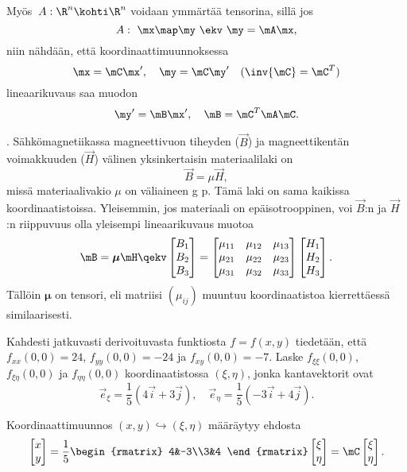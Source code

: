 Myös  $\,A:\R^n\kohti\R^n$ voidaan ymmärtää tensorina, sillä jos
\[
A:\ \mx \map \my \ \ekv \ \my=\mA\mx,
\]
niin nähdään, että koordinaattimuunnoksessa
\[
\mx=\mC\mx',\quad \my=\mC\my'\quad (\inv{\mC}=\mC^T)
\]
lineaarikuvaus saa muodon
\[
\my'=\mB\mx',\quad \mB=\mC^T\mA\mC.
\]
%
\begin{Exa} .
Sähkömagnetiikassa magneettivuon tiheyden ($\vec B$) ja magneettikentän voimakkuuden ($\vec H$)
välinen yksinkertaisin materiaalilaki on
\[
\vec B=\mu\vec H,
\]
missä materiaalivakio $\mu$ on väliaineen g p.
Tämä laki on sama kaikissa koordinaatistoissa. Yleisemmin, jos materiaali on epäisotrooppinen,
voi $\vec B$:n ja $\vec H$:n riippuvuus olla yleisempi lineaarikuvaus muotoa
\[
\mB=\boldsymbol{\mu}\mH \qekv \begin{bmatrix} B_1 \\ B_2 \\ B_3 \end{bmatrix} =
\begin{bmatrix} 
\mu_{11}&\mu_{12}&\mu_{13} \\ \mu_{21}&\mu_{22}&\mu_{23} \\ \mu_{31}&\mu_{32}&\mu_{33} 
\end{bmatrix}
\begin{bmatrix} H_1 \\ H_2 \\ H_3 \end{bmatrix}.
\]
Tällöin $\boldsymbol{\mu}$ on tensori, eli matriisi $(\mu_{ij})$ muuntuu koordinaatistoa 
kierrettäessä similaarisesti. \loppu
\end{Exa}
\begin{Exa}
Kahdesti jatkuvasti derivoituvasta funktiosta $f=f(x,y)$ tiedetään, että $f_{xx}(0,0)=24$, 
$f_{yy}(0,0)=-24$ ja $f_{xy}(0,0)=-7$. Laske $f_{\xi\xi}(0,0)$, $f_{\xi\eta}(0,0)$ ja 
$f_{\eta\eta}(0,0)$ koordinaatistossa $(\xi,\eta)$, jonka kantavektorit ovat
\[
\vec e_\xi=\frac{1}{5}(4\vec i + 3\vec j),\quad \vec e_\eta=\frac{1}{5}(-3\vec i +4\vec j).
\]
\end{Exa}
\ratk Koordinaattimuunnos $(x,y)\hookrightarrow (\xi,\eta)$ määräytyy ehdosta
\[
\begin{bmatrix} x\\y \end{bmatrix}=\frac{1}{5}\begin{rmatrix} 4&-3\\3&4 \end{rmatrix}
\begin{bmatrix} \xi \\ \eta \end{bmatrix}=\mC\begin{bmatrix} \xi \\ \eta \end{bmatrix}.
\]
